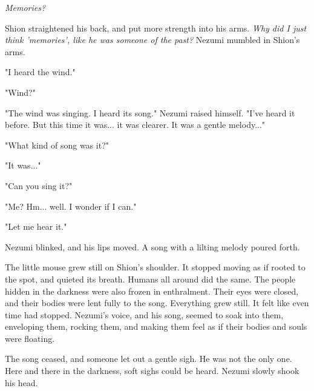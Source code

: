 \emph{Memories?}

Shion straightened his back, and put more strength into his arms. \emph{Why
did I just think 'memories', like he was someone of the past?} Nezumi
mumbled in Shion's arms.

"I heard the wind."

"Wind?"

"The wind was singing. I heard its song." Nezumi raised himself. "I've
heard it before. But this time it was... it was clearer. It was a gentle
melody..."

"What kind of song was it?"

"It was..."

"Can you sing it?"

"Me? Hm... well. I wonder if I can."

"Let me hear it."

Nezumi blinked, and his lips moved. A song with a lilting melody poured
forth.


The little mouse grew still on Shion's shoulder. It stopped moving as if
rooted to the spot, and quieted its breath. Humans all around did the
same. The people hidden in the darkness were also frozen in enthralment.
Their eyes were closed, and their bodies were lent fully to the song.
Everything grew still. It felt like even time had stopped. Nezumi's
voice, and his song, seemed to soak into them, enveloping them, rocking
them, and making them feel as if their bodies and souls were floating.


The song ceased, and someone let out a gentle sigh. He was not the only
one. Here and there in the darkness, soft sighs could be heard. Nezumi
slowly shook his head.

